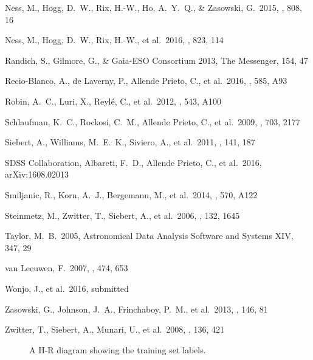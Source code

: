 \documentclass[preprint,trackchanges]{aastex}
\begin{document}
\begin{thebibliography}{dummy}
 Ness, M., Hogg, D.~W., Rix, H.-W., Ho, A.~Y.~Q., \& Zasowski, G.\ 2015, \apj, 808, 16 

 Ness, M., Hogg, D.~W., Rix, H.-W., et al.\ 2016, \apj, 823, 114 

 Randich, S., Gilmore, G., \& Gaia-ESO Consortium 2013, The Messenger, 154, 47 

 Recio-Blanco, A., de Laverny, P., Allende Prieto, C., et al.\ 2016, \aap, 585, A93 

 Robin, A.~C., Luri, X., Reyl{\'e}, C., et al.\ 2012, \aap, 543, A100 

 Schlaufman, K.~C., Rockosi, C.~M., Allende Prieto, C., et al.\ 2009, \apj, 703, 2177 

 Siebert, A., Williams, M.~E.~K., Siviero, A., et al.\ 2011, \aj, 141, 187 

 SDSS Collaboration, Albareti, F.~D., Allende Prieto, C., et al.\ 2016, arXiv:1608.02013 

 Smiljanic, R., Korn, A.~J., Bergemann, M., et al.\ 2014, \aap, 570, A122 

 Steinmetz, M., Zwitter, T., Siebert, A., et al.\ 2006, \aj, 132, 1645 

 Taylor, M.~B.\ 2005, Astronomical Data Analysis Software and Systems XIV, 347, 29 

 van Leeuwen, F.\ 2007, \aap, 474, 653 

 Wonjo, J., et al.\ 2016, submitted

 Zasowski, G., Johnson, J.~A., Frinchaboy, P.~M., et al.\ 2013, \aj, 146, 81 

 Zwitter, T., Siebert, A., Munari, U., et al.\ 2008, \aj, 136, 421 

\end{thebibliography}

\clearpage

\begin{figure}[p]
\caption{A H-R diagram showing the training set labels.\label{fig:training-set-hrd}}
\end{figure}
\end{document}
